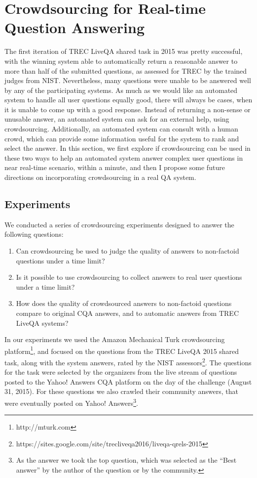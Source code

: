 \section{Crowdsourcing for Real-time Question Answering}
\label{sec:non-factoid:crowd}

The first iteration of TREC LiveQA shared task in 2015 was pretty successful, with the winning system able to automatically return a reasonable answer to more than half of the submitted questions, as assessed for TREC by the trained judges from NIST.
Nevertheless, many questions were unable to be answered well by any of the participating systems.
As much as we would like an automated system to handle all user questions equally good, there will always be cases, when it is unable to come up with a good response.
Instead of returning a non-sense or unusable answer, an automated system can ask for an external help, \eg using crowdsourcing.
Additionally, an automated system can consult with a human crowd, which can provide some information useful for the system to rank and select the answer.
In this section, we first explore if crowdsourcing can be used in these two ways to help an automated system answer complex user questions in near real-time scenario, \eg within a minute, and then I propose some future directions on incorporating crowdsourcing in a real QA system.

\subsection{Experiments}
\label{sec:experiments}

We conducted a series of crowdsourcing experiments designed to answer the following questions:
\begin{enumerate}
\item Can crowdsourcing be used to judge the quality of answers to non-factoid questions under a time limit?
\item Is it possible to use crowdsourcing to collect answers to real user questions under a time limit?
\item How does the quality of crowdsourced answers to non-factoid questions compare to original CQA answers, and to automatic answers from TREC LiveQA systems?
\end{enumerate}

In our experiments we used the Amazon Mechanical Turk crowdsourcing platform\footnote{http://mturk.com}, and focused on the questions from the TREC LiveQA 2015 shared task, along with the system answers, rated by the NIST assessors\footnote{https://sites.google.com/site/trecliveqa2016/liveqa-qrels-2015}.
The questions for the task were selected by the organizers from the live stream of questions posted to the Yahoo! Answers CQA platform on the day of the challenge (August 31, 2015).
For these questions we also crawled their community answers, that were eventually posted on Yahoo! Answers\footnote{As the answer we took the top question, which was selected as the ``Best answer'' by the author of the question or by the community.}.

